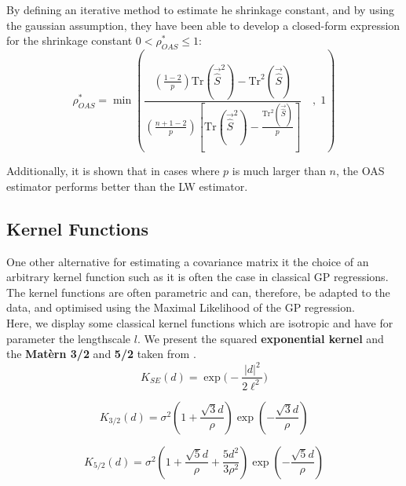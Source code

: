 By defining an iterative method to estimate he shrinkage constant, and by using the gaussian assumption, they have been able to develop a closed-form expression for the shrinkage constant $0 < \rho^*_{OAS}  \leq 1$: \\

\begin{equation}
    \rho^*_{OAS} = \min \left(   \frac{\left(\frac{1-2}{p}\right) \text{Tr}( \vec{\hat{S}} ^2) -  \text{Tr}^2( \vec{\hat{S}} ) }{\left( \frac{n+1-2}{p}\right)\left[ \text{Tr}( \vec{\hat{S}} ^2) - \frac{ \text{Tr}^2( \vec{\hat{S}} ) }{p} \right] } \quad , \; 1\right)
    \label{equ:cov:shrink:oas}
\end{equation}

Additionally, it is shown that in cases where $p$ is much larger than $n$, the OAS estimator performs better than the LW estimator. 



\subsection{Kernel Functions}


One other alternative for estimating a covariance matrix it the choice of an arbitrary kernel function such as it is often the case in classical GP regressions. The kernel functions are often parametric and can, therefore, be adapted to the data, and optimised using the Maximal Likelihood of the GP regression.  \\ 

Here, we display some classical kernel functions which are isotropic and have for parameter the lengthscale $l$. We present the squared \textbf{exponential kernel} and the \textbf{Matèrn 3/2} and \textbf{5/2} taken from \cite{rasmussen_gaussian_2006}. \\


\begin{equation}
     K_{SE}(d) = \exp \Big(-\frac{|d|^2}{2\ell^2} \Big)
\end{equation}

\begin{equation}
    K_{3/2}(d) = \sigma^2\left(1+\frac{\sqrt{3}d}{\rho}\right)\exp\left(-\frac{\sqrt{3}d}{\rho}\right)
\end{equation} 
 
\begin{equation}
    K_{5/2}(d) = \sigma^2\left(1+\frac{\sqrt{5}d}{\rho}+\frac{5d^2}{3\rho^2}\right)\exp\left(-\frac{\sqrt{5}d}{\rho}\right)
\end{equation}

